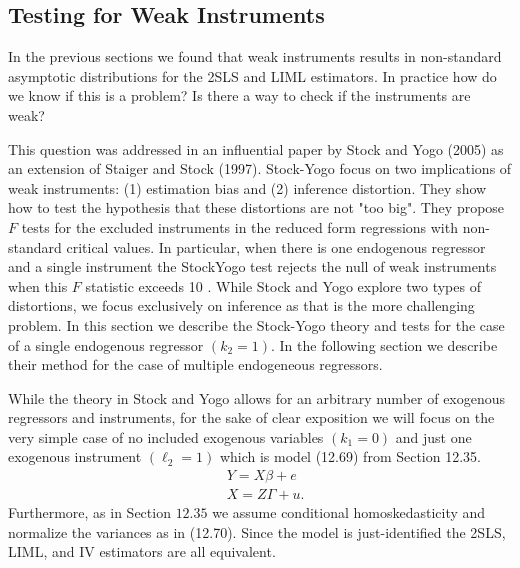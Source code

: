 \documentclass[10pt]{article}
\begin{document}
\subsection{Testing for Weak Instruments}
In the previous sections we found that weak instruments results in non-standard asymptotic distributions for the 2SLS and LIML estimators. In practice how do we know if this is a problem? Is there a way to check if the instruments are weak?

This question was addressed in an influential paper by Stock and Yogo (2005) as an extension of Staiger and Stock (1997). Stock-Yogo focus on two implications of weak instruments: (1) estimation bias and (2) inference distortion. They show how to test the hypothesis that these distortions are not "too big". They propose $F$ tests for the excluded instruments in the reduced form regressions with non-standard critical values. In particular, when there is one endogenous regressor and a single instrument the StockYogo test rejects the null of weak instruments when this $F$ statistic exceeds 10 . While Stock and Yogo explore two types of distortions, we focus exclusively on inference as that is the more challenging problem. In this section we describe the Stock-Yogo theory and tests for the case of a single endogenous regressor $\left(k_{2}=1\right)$. In the following section we describe their method for the case of multiple endogeneous regressors.

While the theory in Stock and Yogo allows for an arbitrary number of exogenous regressors and instruments, for the sake of clear exposition we will focus on the very simple case of no included exogenous variables $\left(k_{1}=0\right)$ and just one exogenous instrument $\left(\ell_{2}=1\right)$ which is model (12.69) from Section 12.35.
$$
\begin{aligned}
&Y=X \beta+e \\
&X=Z \Gamma+u .
\end{aligned}
$$
Furthermore, as in Section $12.35$ we assume conditional homoskedasticity and normalize the variances as in (12.70). Since the model is just-identified the 2SLS, LIML, and IV estimators are all equivalent.
\end{document}
